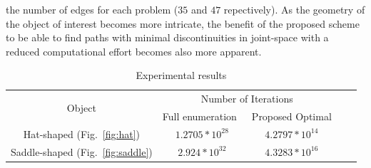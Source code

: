\documentclass[journal]{IEEEtran}
\begin{document}
the number of edges for each problem ($35$ and $47$ repectively). As the geometry of the object of interest becomes more intricate, 
the benefit of the proposed scheme to be able to find paths with minimal discontinuities in joint-space with a reduced computational effort 
becomes also more apparent.
\begin{table}
\centering
\caption{Experimental results}
\begin{tabular}{ | c | c | c | c | c | }
 \hline
  \multirow{2}{*}{Object}  & \multicolumn{2}{|c|}{Number of Iterations} \\
\cline{2-3}
  						& Full enumeration~\cite{Yang2020Cellular}  &  Proposed Optimal \\
 \hline
 Hat-shaped (Fig.~\ref{fig:hat})   	& $1.2705*10^{28}$    				&   $4.2797*10^{14}$\\
 \hline
 Saddle-shaped (Fig.~\ref{fig:saddle})					&   $2.924*10^{32}$  		&   	$4.3283*10^{16}$\\
 \hline
\end{tabular}
\label{table:results}
\end{table}


\end{document}
